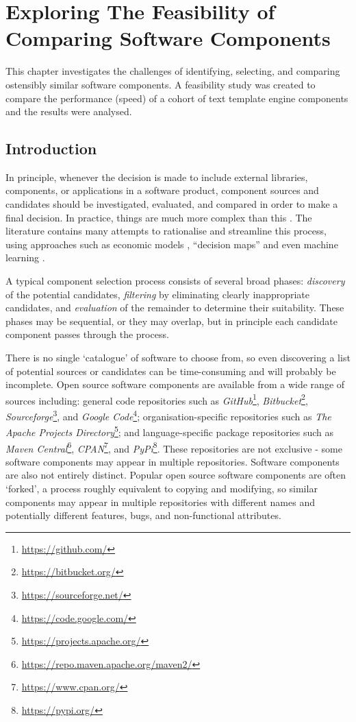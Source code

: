 \chapter{Exploring The Feasibility of Comparing Software Components}
\label{chapter:fs1}

This chapter investigates the challenges of identifying, selecting, and comparing ostensibly similar software components. A feasibility study was created to compare the performance (speed) of a cohort of text template engine components and the results were analysed.

\section{Introduction}
\label{fs1:intro}

In principle, whenever the decision is made to include external libraries, components, or applications in a software product, component sources and candidates should be investigated, evaluated, and compared in order to make a final decision. In practice, things are much more complex than this \citep{Badampudi2016}. The literature contains many attempts to rationalise and streamline this process, using approaches such as economic models \citep{Milkman2009}, \enquote{decision maps} \citep{Lago2019} and even machine learning \citep{Maxville2004}.

A typical component selection process consists of several broad phases: \emph{discovery} of the potential candidates, \emph{filtering} by eliminating clearly inappropriate candidates, and \emph{evaluation} of the remainder to determine their suitability. These phases may be sequential, or they may overlap, but in principle each candidate component passes through the process.

There is no single `catalogue' of software to choose from, so even discovering a list of potential sources or candidates can be time-consuming and will probably be incomplete. Open source software components are available from a wide range of sources including: general code repositories such as \emph{GitHub}\footnote{\url{https://github.com/}}, \emph{Bitbucket}\footnote{\url{https://bitbucket.org/}}, \emph{Sourceforge}\footnote{\url{https://sourceforge.net/}}, and \emph{Google Code}\footnote{\url{https://code.google.com/}}; organisation-specific repositories such as \emph{The Apache Projects Directory}\footnote{\url{https://projects.apache.org/}}; and language-specific package repositories such as \emph{Maven Central}\footnote{\url{https://repo.maven.apache.org/maven2/}}, \emph{CPAN}\footnote{\url{https://www.cpan.org/}}, and \emph{PyPi}\footnote{\url{https://pypi.org/}}. These repositories are not exclusive - some software components may appear in multiple repositories. Software components are also not entirely distinct. Popular open source software components are often `forked', a process roughly equivalent to copying and modifying, so similar components may appear in multiple repositories with different names and potentially different features, bugs, and non-functional attributes.

